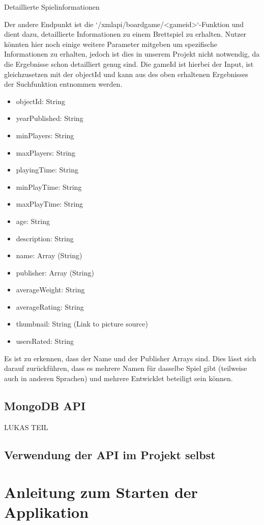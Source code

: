  \large Detaillierte Spielinformationen

Der andere Endpunkt ist die `/xmlapi/boardgame/<gameid>`-Funktion und dient dazu,
detaillierte Informationen zu einem Brettspiel zu erhalten. Nutzer könnten hier noch einige weitere Parameter mitgeben um spezifische Informationen zu erhalten, jedoch ist dies in unserem Projekt nicht notwendig, da die Ergebnisse schon detailliert genug sind.
Die gameId ist hierbei der Input, ist gleichzusetzen mit der objectId und kann aus des oben erhaltenen Ergebnisses der Suchfunktion entnommen werden.
\begingroup
\setlength{\itemsep}{-1pt} %
\setlength{\parskip}{-1pt} %
\begin{itemize}
    \item objectId: String
    \item yearPublished: String
    \item minPlayers: String
    \item maxPlayers: String
    \item playingTime: String
    \item minPlayTime: String
    \item maxPlayTime: String
    \item age: String
    \item description: String
    \item name: Array (String)
    \item publisher: Array (String)
    \item averageWeight: String
    \item averageRating: String
    \item thumbnail: String (Link to picture source)
    \item usersRated: String
\end{itemize}
\endgroup

Es ist zu erkennen, dass der Name und der Publisher Arrays sind. Dies lässt sich darauf zurückführen, dass es mehrere Namen für dasselbe Spiel gibt (teilweise auch in anderen Sprachen) und mehrere Entwicklet beteiligt sein können.

\subsection{MongoDB API}

LUKAS TEIL 
\subsection{Verwendung der API im Projekt selbst}
\section{Anleitung zum Starten der Applikation}
